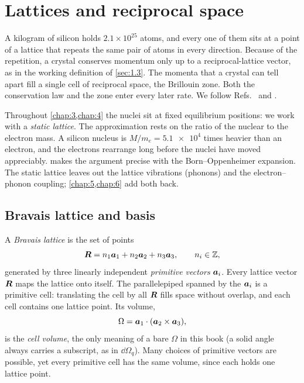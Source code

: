 \section{Lattices and reciprocal space}\label{sec:3.1}

A kilogram of silicon holds $2.1\times10^{25}$ atoms, and every one of them sits at a point of a lattice that repeats the same pair of atoms in every direction. Because of the repetition, a crystal conserves momentum only up to a reciprocal-lattice vector, as in the working definition of \cref{sec:1.3}. The momenta that a crystal can tell apart fill a single cell of reciprocal space, the Brillouin zone. Both the conservation law and the zone enter every later rate. We follow Refs.~\cite[Chaps.~4--6 and 8]{ashcroft1976solid} and \cite[Chaps.~1--2]{kittel2005introduction}.

Throughout \cref{chap:3,chap:4} the nuclei sit at fixed equilibrium positions: we work with a \emph{static lattice}. The approximation rests on the ratio of the nuclear to the electron mass. A silicon nucleus is $M/m_e = \num{5.1e4}$ times heavier than an electron, and the electrons rearrange long before the nuclei have moved appreciably.  makes the argument precise with the Born--Oppenheimer expansion. The static lattice leaves out the lattice vibrations (phonons) and the electron--phonon coupling; \cref{chap:5,chap:6} add both back.

\subsection{Bravais lattice and basis}

A \emph{Bravais lattice} is the set of points
\begin{equation}
  \bm{R} = n_1\bm{a}_1 + n_2\bm{a}_2 + n_3\bm{a}_3, \qquad n_i \in \mathbb{Z},
  \label{eq:3.1-R}
\end{equation}
generated by three linearly independent \emph{primitive vectors} $\bm{a}_i$. Every lattice vector $\bm{R}$ maps the lattice onto itself. The parallelepiped spanned by the $\bm{a}_i$ is a primitive cell: translating the cell by all $\bm{R}$ fills space without overlap, and each cell contains one lattice point. Its volume,
\begin{equation}
  \Omega = \bm{a}_1\cdot(\bm{a}_2\times\bm{a}_3),
  \label{eq:3.1-Omega}
\end{equation}
is the \emph{cell volume}, the only meaning of a bare $\Omega$ in this book (a solid angle always carries a subscript, as in $\dd\Omega_q$). Many choices of primitive vectors are possible, yet every primitive cell has the same volume, since each holds one lattice point.

